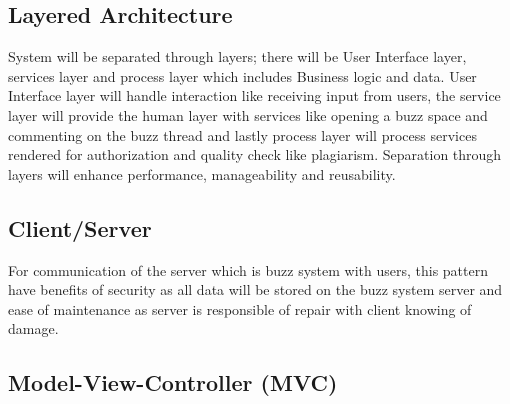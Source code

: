 
\subsection{Layered Architecture}

System will be separated through layers; there will be User Interface  layer, services layer and process layer which includes Business logic and data. User Interface layer will handle interaction like receiving input from users, the service layer will provide the human layer with services like opening a buzz space and commenting on the buzz thread and lastly process layer will process services rendered for authorization and quality check like plagiarism. Separation through layers will enhance performance, manageability and reusability.
	
\subsection{Client/Server} 
For communication of the server which is buzz system with users, this pattern have benefits of security as all data will be stored on the buzz system server and ease of maintenance as server is responsible of repair with client knowing of damage.

\subsection {Model-View-Controller (MVC)}

